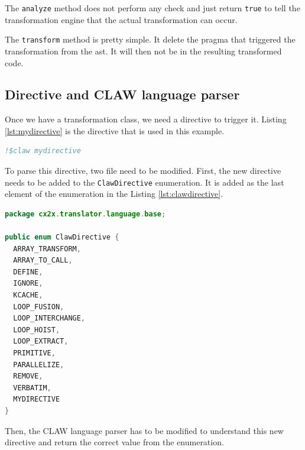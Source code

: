 \documentclass[a4paper, 11pt]{report}
\begin{document}
The \lstinline|analyze| method does not perform any check and just return 
\lstinline|true| to tell the transformation engine that the actual 
transformation can occur. 

The \lstinline|transform| method is pretty simple. It delete the pragma that 
triggered the transformation from the \gls{ast}. It will then not be in the 
resulting transformed code.

\subsection{Directive and CLAW language parser}
Once we have a transformation class, we need a directive to trigger it. Listing
\ref{lst:mydirective} is the directive that is used in this example.

\begin{lstlisting}[label=lst:mydirective, caption=Example directive, language=fortran]
!$claw mydirective
\end{lstlisting}

To parse this directive, two file need to be modified. First, the new directive
needs to be added to the \lstinline|ClawDirective| enumeration. It is added as 
the last element of the enumeration in the Listing \ref{lst:clawdirective}.

\begin{lstlisting}[label=lst:clawdirective, caption=ClawDirective.java, language=java]
package cx2x.translator.language.base;

public enum ClawDirective {
  ARRAY_TRANSFORM,
  ARRAY_TO_CALL,
  DEFINE,
  IGNORE,
  KCACHE,
  LOOP_FUSION,
  LOOP_INTERCHANGE,
  LOOP_HOIST,
  LOOP_EXTRACT,
  PRIMITIVE,
  PARALLELIZE,
  REMOVE,
  VERBATIM,
  MYDIRECTIVE
}
\end{lstlisting}

Then, the CLAW language parser has to be modified to understand this new 
directive and return the correct value from the enumeration. 
\end{document}
